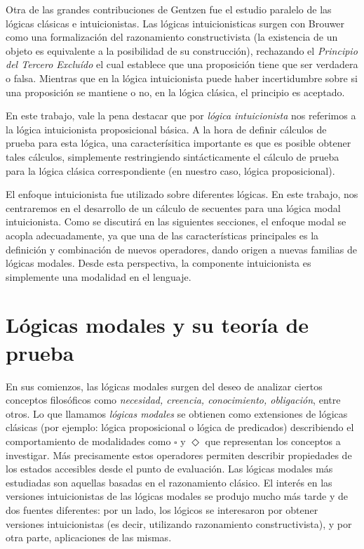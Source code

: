 Otra de las grandes contribuciones de Gentzen fue el estudio paralelo de las lógicas clásicas e intuicionistas. Las lógicas intuicionisticas surgen con Brouwer \cite{brouwer1920} como una formalización del razonamiento constructivista (la existencia de un objeto es equivalente a la posibilidad de su construcción), rechazando el \emph{Principio del Tercero Excluído} el cual establece que una proposición tiene que ser verdadera o falsa. Mientras que en la lógica intuicionista puede haber incertidumbre sobre si una proposición se mantiene o no, en la lógica clásica, el principio es aceptado.

En este trabajo, vale la pena destacar que por \emph{lógica intuicionista} nos referimos a la lógica intuicionista proposicional básica. A la hora de definir cálculos de prueba para esta lógica, una caracterísitica importante es que es posible obtener tales cálculos, simplemente restringiendo sintácticamente el cálculo de prueba para la lógica clásica correspondiente \cite{vandalen2004} (en nuestro caso, lógica proposicional).

El enfoque intuicionista fue utilizado sobre diferentes lógicas. En este trabajo, nos centraremos en el desarrollo de un cálculo de secuentes para una lógica modal intuicionista. Como se discutirá en las siguientes secciones, el enfoque modal se acopla adecuadamente, ya que una de las características principales es la definición y combinación de nuevos operadores, dando origen a nuevas familias de lógicas modales. Desde esta perspectiva, la componente intuicionista es simplemente una modalidad en el lenguaje.


\section{Lógicas modales y su teoría de prueba}

En sus comienzos, las lógicas modales surgen del deseo de analizar ciertos conceptos filosóficos como \emph{necesidad, creencia, conocimiento, obligación}, entre otros. Lo que llamamos \emph{lógicas modales} se obtienen como extensiones de lógicas clásicas (por ejemplo: lógica proposicional o lógica de predicados) describiendo el comportamiento de modalidades como $\square$ y $\Diamond$ que representan los conceptos a investigar. Más precisamente estos operadores permiten describir propiedades de los estados accesibles desde el punto de evaluación. Las lógicas modales más estudiadas son aquellas basadas en el razonamiento clásico. El interés en las versiones intuicionistas de las lógicas modales se produjo mucho más tarde y de dos fuentes diferentes: por un lado, los lógicos se interesaron por obtener versiones intuicionistas (es decir, utilizando razonamiento constructivista), y por otra parte, aplicaciones de las mismas.

